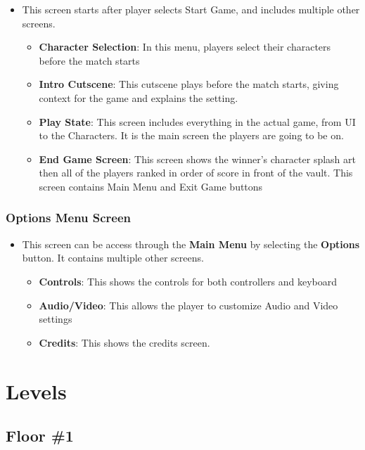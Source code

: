 \documentclass[14pt]{report}
\begin{document}
\begin{itemize}
    \item This screen starts after player selects Start Game, and includes multiple other screens.
    \begin{itemize}    
        \item \textbf{Character Selection}: In this menu, players select their characters before the match starts
        \item \textbf{Intro Cutscene}: This cutscene plays before the match starts, giving context for the game and explains the setting.
        \item \textbf{Play State}: This screen includes everything in the actual game, from UI to the Characters. It is the main screen the players are going to be on.
        \item \textbf{End Game Screen}: This screen shows the winner’s character splash art then all of the players ranked in order of score in front of the vault. This screen contains Main Menu and Exit Game buttons
    \end{itemize}
\end{itemize}

\subsection{Options Menu Screen}
\begin{itemize}
    \item This screen can be access through the \textbf{Main Menu} by selecting the \textbf{Options} button. It contains multiple other screens.
    \begin{itemize}
        \item \textbf{Controls}: This shows the controls for both controllers and keyboard
        \item \textbf{Audio/Video}: This allows the player to customize Audio and Video settings
        \item \textbf{Credits}: This shows the credits screen.    
    \end{itemize}
\end{itemize}

\chapter{Levels}

\section{Floor \#1}
\end{document}
